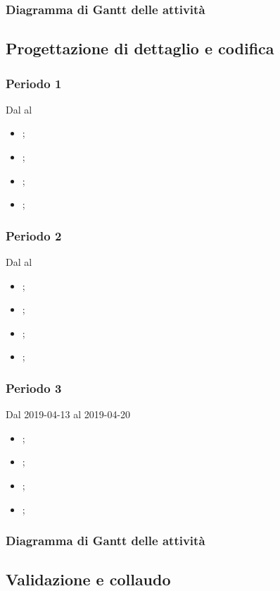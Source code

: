 \subsubsection{Diagramma di Gantt delle attività}


\subsection{Progettazione di dettaglio e codifica}

\subsubsection{Periodo 1} 
Dal al
\begin{itemize}
	\item \textbf{};
	\item \textbf{};
	\item \textbf{};
	\item \textbf{};
\end{itemize}
\subsubsection{Periodo 2} 
Dal al
\begin{itemize}
	\item \textbf{};
	\item \textbf{};
	\item \textbf{};
	\item \textbf{};
\end{itemize}
\subsubsection{Periodo 3} 
Dal 2019-04-13 al 2019-04-20
\begin{itemize}
	\item \textbf{};
	\item \textbf{};
	\item \textbf{};
	\item \textbf{};
\end{itemize}
\subsubsection{Diagramma di Gantt delle attività}


\subsection{Validazione e collaudo}

